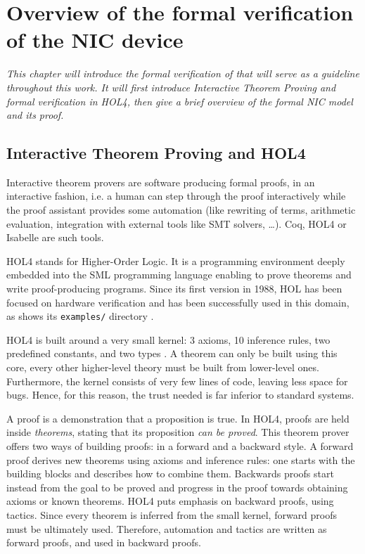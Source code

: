 \documentclass{kththesis}
\begin{document}
\chapter{Overview of the formal verification of the NIC device} \label{chapter-overview-nic}
\vspace{-1cm}
\textit{This chapter will introduce the formal verification of \cite{haglund_formal_2016} that will serve as a guideline throughout this work. It will first introduce Interactive Theorem Proving and formal verification in HOL4, then give a brief overview of the formal NIC model and its proof.}

\section{Interactive Theorem Proving and HOL4} \label{hol4-presentation}

Interactive theorem provers are software producing formal proofs, in an
interactive fashion, i.e. a human can step through the proof interactively while the proof assistant provides some automation (like rewriting of terms, arithmetic evaluation, integration with external tools like SMT solvers, \dots). Coq, HOL4 or Isabelle are such tools.

HOL4 \cite{noauthor_hol_nodate} stands for Higher-Order Logic. It is a programming environment deeply embedded into the \gls{SML} programming language enabling to prove theorems and write \gls{proof-producing} programs. Since its first version in 1988, HOL has been focused on hardware verification and has been successfully used in this domain, as shows its \texttt{examples/} directory \cite{noauthor_canonical_2019}.

HOL4 is built around a very small kernel: 3 axioms, 10 inference rules, two predefined constants, and two types \cite{tuerk_interactive_nodate} \footnotemark. A theorem can only be built using this core, every other higher-level theory must be built from lower-level ones. Furthermore, the kernel consists of very few lines of code, leaving less space for bugs. Hence, for this reason, the trust needed is far inferior to standard systems.


A proof is a demonstration that a proposition is true. In HOL4, proofs are held inside \textit{theorems}, stating that its proposition \textit{can be proved}. This theorem prover offers two ways of building proofs: in a forward and a backward style. A forward proof derives new theorems using axioms and inference rules: one starts with the building blocks and describes how to combine them. Backwards proofs start instead from the goal to be proved and progress in the proof towards obtaining axioms or known theorems. HOL4 puts emphasis on backward proofs, using tactics. Since every theorem is inferred from the small kernel, forward proofs must be ultimately used. Therefore, automation and tactics are written as forward proofs, and used in backward proofs.
\end{document}
